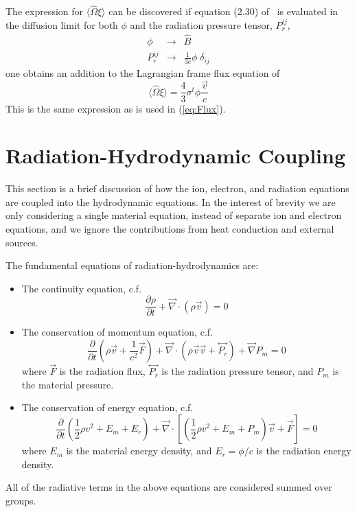 \documentclass[12pt]{article}
\newcommand{\partl}[2]{\ensuremath{\frac{\partial{#1}}{\partial{#2}}}}\newcommand{\del}{\ensuremath{\vec{\nabla}}}
\newcommand{\tensor}[1]{\ensuremath{\stackrel{\leftrightarrow}{#1}}}
\begin{document}
The expression for $\langle \hat{\Omega} \xi \rangle$ can be discovered
if equation (2.30) of~\cite{MihalasKlein} is evaluated in the diffusion limit
for both $\phi$ and the radiation pressure tensor, $P_{r}^{ij}$,
\begin{eqnarray}
        \phi &\rightarrow& \hat{B} \\
        P_{r}^{ij} &\rightarrow& \frac{1}{3c} \phi \; \delta_{ij} 
\end{eqnarray}
one obtains an addition to the Lagrangian frame flux equation of
\begin{equation}
        \langle \hat{\Omega} \xi \rangle = 
                \frac{4}{3} \sigma^{t} \phi \frac{\vec{v}}{c}
\end{equation}
This is the same expression as is used in (\ref{eq:Flux}).

\section{Radiation-Hydrodynamic Coupling}

This section is a brief discussion of how the ion, electron, and radiation
equations are coupled into the hydrodynamic equations.
In the interest of brevity we are only considering a single material equation,
instead of separate ion and electron equations, and we ignore the contributions
from heat conduction and external sources.

The fundamental equations of radiation-hydrodynamics are:
\begin{itemize}
  \item The continuity equation, c.f.\ \cite[Eq.~(16)]{PomraningLAUR}
     \begin{equation}
        \partl{\rho}{t} + \del \cdot (\rho \vec{v}) = 0
     \label{eq:continuity}
     \end{equation}
  \item The conservation of momentum equation, c.f.\ \cite[Eq.~(17)]{PomraningLAUR}
     \begin{equation}
        \partl{}{t}\left( \rho \vec{v} + \frac{1}{c^2} \vec{F} \right)
         + \del \cdot \left( \rho \vec{v} \vec{v} + \tensor{P_{r}} \right)
         + \del P_{m}
         = 0
     \label{eq:momentum}
     \end{equation}
     where $\vec{F}$ is the radiation flux,
     $\tensor{P_{r}}$ is the radiation pressure tensor,
     and $P_{m}$ is the material pressure.
  \item The conservation of energy equation,
          c.f.\ \cite[Eq.~(18)]{PomraningLAUR}
     \begin{equation}
        \partl{}{t}\left( \frac{1}{2} \rho v^2
                          + E_{m} + E_{r} \right)
         + \del \cdot \left[
              \left( \frac{1}{2} \rho v^2 + E_{m} + P_{m} \right) \vec{v}
              + \vec{F} \right]
         = 0
     \label{eq:totalenergy}
     \end{equation}
     where $E_{m}$ is the material energy density, and $E_{r} = \phi / c$
     is the radiation energy density.
\end{itemize}
All of the radiative terms in the above equations are considered summed
over groups.
\end{document}
